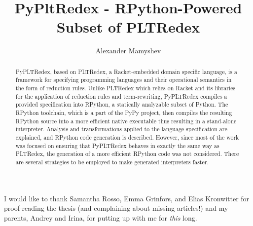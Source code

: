 \documentclass[mscthesis, 11pt]{usiinfthesis}
\title{PyPltRedex - RPython-Powered Subset of PLTRedex} %
\author{Alexander Mamyshev} %
\begin{document}
\maketitle %

\frontmatter %

\begin{abstract}
PyPLTRedex, based on PLTRedex, a Racket-embedded domain specific language, is a framework for specifying programming languages and their operational semantics in the form of reduction rules. Unlike PLTRedex which relies on Racket and its libraries for the application of reduction rules and term-rewriting, PyPLTRedex compiles a  provided specification into RPython, a statically analyzable subset of Python. The RPython toolchain, which is a part of the PyPy project, then compiles the resulting RPython source into a more efficient native executable thus resulting in a stand-alone interpreter. Analysis and transformations applied to the language specification are explained, and RPython code generation is described. However, since most of the work was focused on ensuring that PyPLTRedex behaves in exactly the same way as PLTRedex, the generation of a  more efficient RPython code was not considered. There are several strategies to be employed to make generated interpreters faster.
\end{abstract}


\begin{acknowledgements}
I would like to thank Samantha Rosso, Emma Grinfors, and Elias Kronwitter for proof-reading the thesis (and complaining about missing articles!) and my parents, Andrey and Irina, for putting up with me for \textit{this} long.
\end{acknowledgements}

\tableofcontents 

\mainmatter

%








%


\backmatter

%
%



\end{document}

